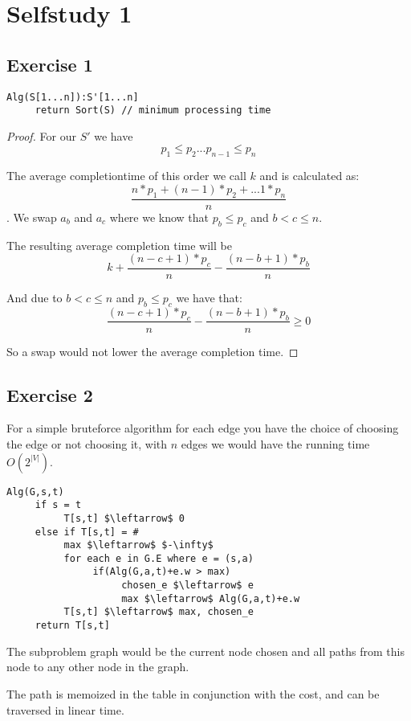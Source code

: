 \documentclass[12pt,a4paper]{report}
\begin{document}
\chapter*{Selfstudy 1}
\section*{Exercise 1}
\begin{lstlisting}
Alg(S[1...n]):S'[1...n]
     return Sort(S) // minimum processing time
\end{lstlisting}

\begin{proof}
For our $S'$ we have 
$$p_1 \leq p_2 ... p_{n-1} \leq p_n$$


The average completiontime of this order we call $k$ and is calculated as:
$$\frac{n*p_1 + (n-1)*p_2 + ... 1 * p_n}{n}$$. We swap $a_b$ and $a_c$ where we know that $p_b \leq p_c$ and $b < c \leq n$.

The resulting average completion time will be 
$$k + \frac{(n-c +1)*p_c}{n} - \frac{(n-b +1)*p_b}{n}$$

And due to $b < c \leq n$ and $p_b \leq p_c$ we have that:
$$\frac{(n-c +1)*p_c}{n} - \frac{(n-b +1)*p_b}{n} \geq 0$$

So a swap would not lower the average completion time.
\end{proof}

\section*{Exercise 2}
For a simple bruteforce algorithm for each edge you have the choice of choosing the edge or not choosing it, with $n$ edges we would have the running time $O(2^{|V|})$.

\begin{lstlisting}
Alg(G,s,t)
     if s = t
          T[s,t] $\leftarrow$ 0
     else if T[s,t] = #
          max $\leftarrow$ $-\infty$
          for each e in G.E where e = (s,a)
               if(Alg(G,a,t)+e.w > max)
                    chosen_e $\leftarrow$ e                    
                    max $\leftarrow$ Alg(G,a,t)+e.w
          T[s,t] $\leftarrow$ max, chosen_e
     return T[s,t]
\end{lstlisting}

The subproblem graph would be the current node chosen and all paths from this node to any other node in the graph.

The path is memoized in the table in conjunction with the cost, and can be traversed in linear time.
\end{document}
